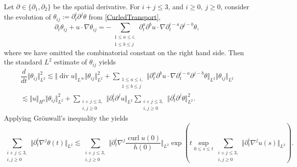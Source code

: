 \documentclass[reqno,11pt]{amsart}
\newcommand{\norm}[2]{\Vert #1 \Vert_{#2}}
\DeclareMathOperator{\Div}{div}
\DeclareMathOperator{\curl}{curl}
\theoremstyle{plain}
\theoremstyle{definition}
\numberwithin{equation}{section}
\begin{document}
Let $ \partial \in \lbrace \partial_1, \partial_2 \rbrace $ be the spatial derivative.  
For $ i + j \leq 3 $, and $ i \geq 0, \ j \geq 0 $, consider the evolution of $ \theta_{ij}:=\partial_t^i \partial^j \theta $ from \eqref{CurledTransport}, 
\begin{equation}
    \label{eq:dd-curl-2d}
    \partial_t \theta_{ij} + u \cdot \nabla \theta_{ij} = - \sum_{\substack{1\leq a \leq i, \\ 1 \leq b \leq j}} \partial_t^{a} \partial^{b}u \cdot \nabla \partial_t^{i-a}\partial^{j-b} \theta,
\end{equation}
where we have omitted the combinatorial constant on the right hand side. 
Then the standard $ L^2 $ estimate of $ \theta_{ij} $ yields
\begin{equation}
    \label{est:theta-ij}
    \begin{gathered}
    \dfrac{d}{dt}\norm{\theta_{ij}}{L^2}^2 \lesssim \norm{ \Div u}{L^\infty} \norm{\theta_{ij}}{L^2}^2 + \sum_{\substack{1\leq a \leq i, \\ 1 \leq b \leq j}} \norm{\partial_t^{a} \partial^{b}u \cdot \nabla \partial_t^{i-a}\partial^{j-b} \theta}{L^2} \norm{\theta_{ij}}{L^2}\\
    \lesssim \norm{u}{H^3} \norm{\theta_{ij}}{L^2}^2 + \sum_{\substack{i+j\leq 3, \\ i,j \geq 0}}\norm{\partial_t^i\partial^j u}{L^2} \sum_{\substack{i+j\leq 3, \\ i,j \geq 0}} \norm{\partial_t^i \partial^j \theta}{L^2}^2.
    \end{gathered}
\end{equation}
Applying Gr\"onwall's inequality the yields
\begin{equation}
    \label{est:theta-2}
\sum_{\substack{i+j\leq 3, \\ i,j \geq 0}} \norm{\partial_t^i \nabla^j \theta (t)}{L^2}  \lesssim \sum_{\substack{i+j\leq 3, \\ i,j \geq 0}} \norm{\partial_t^i \nabla^j \frac{\curl u (0)}{h(0)}}{L^2} \exp (t \sup_{0\leq s \leq t}  \sum_{\substack{i+j\leq 3, \\ i,j \geq 0}}\norm{\partial_t^i\nabla^j u(s)}{L^2} ).
\end{equation}
\end{document}

